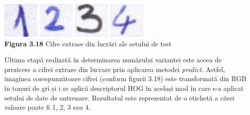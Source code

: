 \documentclass[a4paper,12pt]{report}
\newcommand\tab[1][1cm]{\hspace*{#1}}
\begin{document}
\begin {center} 
	\begin {footnotesize} 
		\includegraphics[width = 18mm]{fig3_18_1} 
		\includegraphics[width = 18mm]{fig3_18_2} 
		\includegraphics[width = 18mm]{fig3_18_3} 
		\includegraphics[width = 18mm]{fig3_18_4} \\
		\textbf  {Figura 3.18} Cifre extrase din lucrări ale setului de test
	\end {footnotesize} 
\end {center} 
\tab Ultima etapă realizată în determinarea numărului variantei este aceea de prezicere a cifrei extrase din lucrare prin aplicarea metodei \textit{predict}. Astfel, imaginea corespunzătoare cifrei (conform figurii 3.18) este transformată din RGB în tonuri de gri și i se aplică descriptorul HOG în același mod în care s-a aplicat setului de date de antrenare. Rezultatul este reprezentat de o etichetă a cărei valoare poate fi 1, 2, 3 sau 4. 
\end{document}
